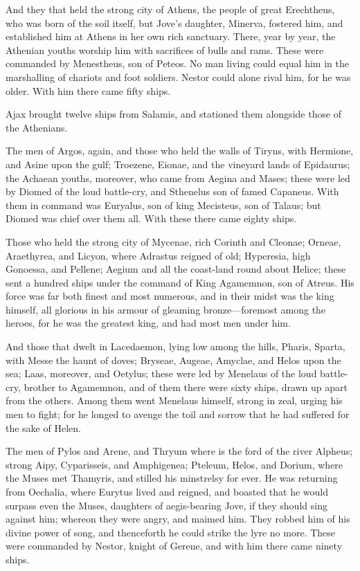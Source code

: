 And they that held the strong city of Athens, the people of great
Erechtheus, who was born of the soil itself, but Jove’s daughter, Minerva,
fostered him, and established him at Athens in her own rich sanctuary.
There, year by year, the Athenian youths worship him with sacrifices of
bulls and rams. These were commanded by Menestheus, son of Peteos. No man
living could equal him in the marshalling of chariots and foot soldiers.
Nestor could alone rival him, for he was older. With him there came fifty
ships.

Ajax brought twelve ships from Salamis, and stationed them alongside those
of the Athenians.

The men of Argos, again, and those who held the walls of Tiryns, with
Hermione, and Asine upon the gulf; Troezene, Eionae, and the vineyard
lands of Epidaurus; the Achaean youths, moreover, who came from Aegina and
Mases; these were led by Diomed of the loud battle-cry, and Sthenelus son
of famed Capaneus. With them in command was Euryalus, son of king
Mecisteus, son of Talaus; but Diomed was chief over them all. With these
there came eighty ships.

Those who held the strong city of Mycenae, rich Corinth and Cleonae;
Orneae, Araethyrea, and Licyon, where Adrastus reigned of old; Hyperesia,
high Gonoessa, and Pellene; Aegium and all the coast-land round about
Helice; these sent a hundred ships under the command of King Agamemnon,
son of Atreus. His force was far both finest and most numerous, and in
their midst was the king himself, all glorious in his armour of gleaming
bronze—foremost among the heroes, for he was the greatest king, and
had most men under him.

And those that dwelt in Lacedaemon, lying low among the hills, Pharis,
Sparta, with Messe the haunt of doves; Bryseae, Augeae, Amyclae, and Helos
upon the sea; Laas, moreover, and Oetylus; these were led by Menelaus of
the loud battle-cry, brother to Agamemnon, and of them there were sixty
ships, drawn up apart from the others. Among them went Menelaus himself,
strong in zeal, urging his men to fight; for he longed to avenge the toil
and sorrow that he had suffered for the sake of Helen.

The men of Pylos and Arene, and Thryum where is the ford of the river
Alpheus; strong Aipy, Cyparisseis, and Amphigenea; Pteleum, Helos, and
Dorium, where the Muses met Thamyris, and stilled his minstrelsy for ever.
He was returning from Oechalia, where Eurytus lived and reigned, and
boasted that he would surpass even the Muses, daughters of aegis-bearing
Jove, if they should sing against him; whereon they were angry, and maimed
him. They robbed him of his divine power of song, and thenceforth he could
strike the lyre no more. These were commanded by Nestor, knight of Gerene,
and with him there came ninety ships.

